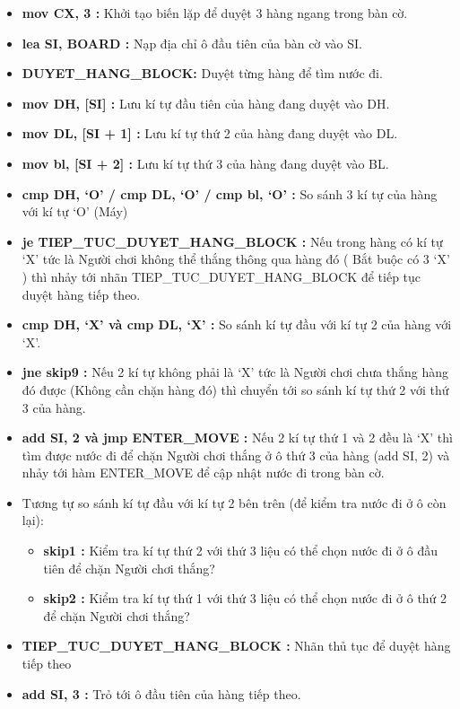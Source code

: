 \begin{itemize}
    \item \textbf{mov CX, 3 :} Khởi tạo biến lặp để duyệt 3 hàng ngang trong bàn cờ.
    \item \textbf{lea SI, BOARD : }Nạp địa chỉ ô đầu tiên của bàn cờ vào SI.
    \item \textbf{DUYET\_HANG\_BLOCK:} Duyệt từng hàng để tìm nước đi. 
    \item \textbf{mov DH, [SI] :} Lưu kí tự đầu tiên của hàng đang duyệt vào DH.
    \item \textbf{mov DL, [SI + 1] :} Lưu kí tự thứ 2 của hàng đang duyệt vào DL.
    \item \textbf{mov bl, [SI + 2] : }Lưu kí tự thứ 3 của hàng đang duyệt vào BL.
    \item \textbf{cmp DH, ‘O’ / cmp DL, ‘O’ / cmp bl, ‘O’ :} So sánh 3 kí tự của hàng với kí tự ‘O’ (Máy) 
    \item \textbf{je TIEP\_TUC\_DUYET\_HANG\_BLOCK :} Nếu trong hàng có kí tự ‘X’ tức là Người chơi không thể thắng thông qua hàng đó ( Bắt buộc có 3 ‘X’ ) thì nhảy tới nhãn TIEP\_TUC\_DUYET\_HANG\_BLOCK để tiếp tục duyệt hàng tiếp theo.
    \item \textbf{cmp DH, ‘X’  và cmp DL, ‘X’ :} So sánh kí tự đầu với kí tự 2 của hàng với ‘X’.
    \item \textbf{jne skip9 :} Nếu 2 kí tự không phải là ‘X’ tức là Người chơi chưa thắng hàng đó được (Không cần chặn hàng đó) thì chuyển tới so sánh kí tự thứ 2 với thứ 3 của hàng.
    \item \textbf{add SI, 2  và  jmp ENTER\_MOVE : }Nếu 2 kí tự thứ 1 và 2 đều là ‘X’ thì tìm được nước đi để chặn Người chơi thắng ở ô thứ 3 của hàng (add SI, 2) và nhảy tới hàm ENTER\_MOVE để cập nhật nước đi trong bàn cờ.
    \item Tương tự so sánh kí tự đầu với kí tự 2 bên trên (để kiểm tra nước đi ở ô còn lại):
    \begin{itemize}
        \item \textbf{skip1 :} Kiểm tra kí tự thứ 2 với thứ 3 liệu có thể chọn nước đi ở ô đầu tiên để chặn Người chơi thắng?
        \item \textbf{skip2 :} Kiểm tra kí tự thứ 1 với thứ 3 liệu có thể chọn nước đi ở ô thứ 2 để chặn Người chơi thắng?
    \end{itemize}
    \item \textbf{TIEP\_TUC\_DUYET\_HANG\_BLOCK :} Nhãn thủ tục để duyệt hàng tiếp theo
    \item \textbf{add SI, 3 :} Trỏ tới ô đầu tiên của hàng tiếp theo.

\end{itemize}
